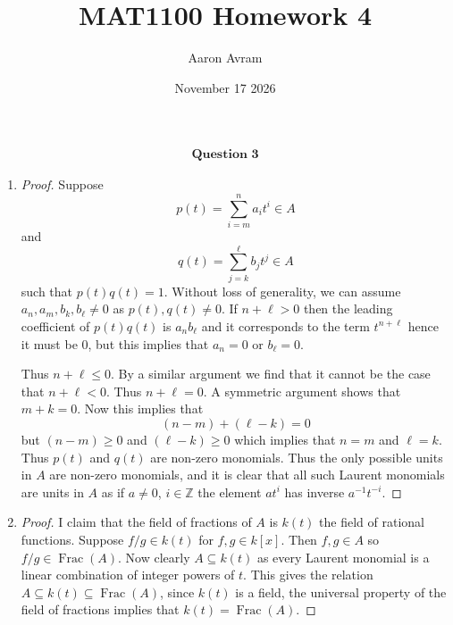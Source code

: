 \documentclass[12pt]{article}
\title{MAT1100 Homework 4}
\author{Aaron Avram}
\date{November 17 2026}
\begin{document}
\newtheorem{definition}{Definition}
\newtheorem{theorem}{Theorem}
\newtheorem{claim}{Claim}
\newtheorem{corollary}{Corollary}

\maketitle

\begin{align*}
    \textbf{Question 3}
\end{align*}

\begin{enumerate}
    \item[(i)]
    \begin{proof}
        Suppose
        \[ p(t) = \sum_{i = m}^n a_it^i \in A \]
        and
        \[ q(t) = \sum_{j = k}^\ell b_jt^j \in A \]
        such that $p(t)q(t) = 1$. Without loss of generality,
        we can assume $a_n, a_m, b_k, b_\ell \neq 0$ as $p(t), q(t) \neq 0$.
        If $n + \ell > 0$ then
        the leading coefficient of $p(t)q(t)$ is $a_nb_\ell$ and it corresponds to the term
        $t^{n + \ell}$ hence it must be 0, but this implies that $a_n = 0$ or $b_\ell = 0$.

        Thus $n + \ell \leq 0$. By a similar argument we find that it cannot be the case that $n + \ell < 0$.
        Thus $n + \ell = 0$.  A symmetric argument shows that $m + k = 0$. Now this implies that
        \[ (n - m) + (\ell - k) = 0 \]
        but $(n-m) \geq 0$ and $(\ell - k) \geq 0$ which implies that $n = m$ and $\ell = k$.
        Thus $p(t)$ and $q(t)$ are non-zero monomials. Thus the only possible units in $A$ are non-zero monomials,
        and it is clear that all such Laurent monomials are units in $A$ as if $a \neq 0$, $i \in \mathbb Z$ the element
        $at^i$ has inverse $a^{-1}t^{-i}$.
    \end{proof}

    \item[(ii)]
    \begin{proof}
        I claim that the field of fractions of $A$ is $k(t)$ the field of rational functions.
        Suppose $f/g \in k(t)$ for $f, g \in k[x]$. Then $f, g \in A$
        so $f/g \in \operatorname{Frac}(A)$. Now clearly $A \subseteq k(t)$
        as every Laurent monomial is a linear combination of integer powers of $t$.
        This gives the relation $A \subseteq k(t) \subseteq \operatorname{Frac}(A)$,
        since $k(t)$ is a field, the universal property of the field of fractions implies that $k(t) = \operatorname{Frac}(A)$.
    \end{proof}


\end{enumerate}
\end{document}
